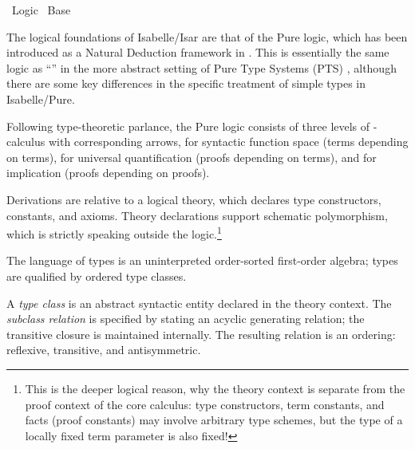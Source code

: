 %
\begin{isabellebody}%
\def\isabellecontext{Logic}%
%
\isadelimtheory
%
\endisadelimtheory
%
\isatagtheory
{}\isamarkupfalse%
\ Logic\isanewline
{}\ Base\isanewline
{}%
\endisatagtheory
{\isafoldtheory}%
%
\isadelimtheory
%
\endisadelimtheory
%
\isamarkuptrue%
%
\begin{isamarkuptext}%
The logical foundations of Isabelle/Isar are that of the Pure logic,
  which has been introduced as a Natural Deduction framework in
  \cite{paulson700}.  This is essentially the same logic as ``'' in the more abstract setting of Pure Type Systems (PTS)
  \cite{Barendregt-Geuvers:2001}, although there are some key
  differences in the specific treatment of simple types in
  Isabelle/Pure.

  Following type-theoretic parlance, the Pure logic consists of three
  levels of \isa{{\isasymlambda}}-calculus with corresponding arrows, \isa{{\isasymRightarrow}} for syntactic function space (terms depending on terms), \isa{{\isasymAnd}} for universal quantification (proofs depending on terms), and
  \isa{{\isasymLongrightarrow}} for implication (proofs depending on proofs).

  Derivations are relative to a logical theory, which declares type
  constructors, constants, and axioms.  Theory declarations support
  schematic polymorphism, which is strictly speaking outside the
  logic.\footnote{This is the deeper logical reason, why the theory
  context \isa{{\isasymTheta}} is separate from the proof context \isa{{\isasymGamma}}
  of the core calculus: type constructors, term constants, and facts
  (proof constants) may involve arbitrary type schemes, but the type
  of a locally fixed term parameter is also fixed!}%
\end{isamarkuptext}%
\isamarkuptrue%
%
\isamarkuptrue%
%
\begin{isamarkuptext}%
The language of types is an uninterpreted order-sorted first-order
  algebra; types are qualified by ordered type classes.

  \medskip A \emph{type class} is an abstract syntactic entity
  declared in the theory context.  The \emph{subclass relation}  is specified by stating an acyclic
  generating relation; the transitive closure is maintained
  internally.  The resulting relation is an ordering: reflexive,
  transitive, and antisymmetric.


\end{isamarkuptext}
\end{isabellebody}
